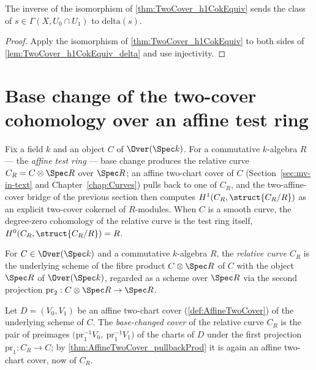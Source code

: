 \begin{lemma}
  \label{lem:TwoCover_h1CokEquiv_symm_mk}
  \leanok
  The inverse of the isomorphism of \ref{thm:TwoCover_h1CokEquiv} sends the class of
  \(s \in \Gamma(X, U_0 \cap U_1)\) to \(\mathrm{delta}(s)\).
\end{lemma}
\begin{proof}
  \leanok
  Apply the isomorphism of \ref{thm:TwoCover_h1CokEquiv} to both sides of
  \ref{lem:TwoCover_h1CokEquiv_delta} and use injectivity.
\end{proof}

\section{Base change of the two-cover cohomology over an affine test ring}

Fix a field \(k\) and an object \(C\) of \(\Over(\Spec k)\). For a commutative \(k\)-algebra \(R\)
--- the \emph{affine test ring} --- base change produces the relative curve
\(C_R = C \otimes \Spec R\) over \(\Spec R\); an affine two-chart cover of \(C\)
(Section~\ref{sec:mv-in-text} and Chapter~\ref{chap:Curves}) pulls back to one of \(C_R\), and the
two-affine-cover bridge of the previous section then computes \(H^1(C_R, \struct{C_R/R})\) as an
explicit two-cover cokernel of \(R\)-modules. When \(C\) is a smooth curve, the degree-zero
cohomology of the relative curve is the test ring itself, \(H^0(C_R, \struct{C_R/R}) = R\).

\begin{definition}
  \label{def:relCurve}
  \leanok
  For \(C \in \Over(\Spec k)\) and a commutative \(k\)-algebra \(R\), the \emph{relative curve}
  \(C_R\) is the underlying scheme of the fibre product \(C \otimes \Spec R\) of \(C\) with the
  object \(\Spec R\) of \(\Over(\Spec k)\), regarded as a scheme over \(\Spec R\) via the second
  projection \(\mathrm{pr}_2 : C \otimes \Spec R \to \Spec R\).
\end{definition}

\begin{definition}
  \label{def:relCover}
  \leanok
  Let \(D = (V_0, V_1)\) be an affine two-chart cover (\ref{def:AffineTwoCover}) of the underlying
  scheme of \(C\). The \emph{base-changed cover} of the relative curve \(C_R\) is the pair of
  preimages \(\bigl(\mathrm{pr}_1^{-1} V_0,\ \mathrm{pr}_1^{-1} V_1\bigr)\) of the charts of \(D\)
  under the first projection \(\mathrm{pr}_1 : C_R \to C\); by
  \ref{thm:AffineTwoCover_pullbackProd} it is again an affine two-chart cover, now of \(C_R\).
\end{definition}

